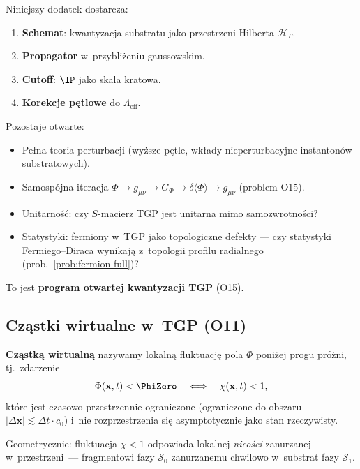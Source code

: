 \begin{problem}%
\label{prob:kwantyzacja}
Niniejszy dodatek dostarcza:
\begin{enumerate}[nosep]
    \item \textbf{Schemat}: kwantyzacja substratu jako przestrzeni
          Hilberta $\mathcal{H}_\Gamma$.
    \item \textbf{Propagator} w~przybliżeniu gaussowskim.
    \item \textbf{Cutoff}: $\lP$ jako skala kratowa.
    \item \textbf{Korekcje pętlowe} do $\Lambda_{\mathrm{eff}}$.
\end{enumerate}
Pozostaje otwarte:
\begin{itemize}[nosep]
    \item Pełna teoria perturbacji (wyższe pętle,
          wkłady nieperturbacyjne instantonów substratowych).
    \item Samospójna iteracja $\Phi \to g_{\mu\nu} \to G_\Phi
          \to \delta\langle\Phi\rangle \to g_{\mu\nu}$
          (problem O15).
    \item Unitarność: czy $S$-macierz TGP jest unitarna
          mimo samozwrotności?
    \item Statystyki: fermiony w~TGP jako topologiczne defekty
          --- czy statystyki Fermiego--Diraca wynikają
          z~topologii profilu radialnego (prob.~\ref{prob:fermion-full})?
\end{itemize}
To jest \textbf{program otwartej kwantyzacji TGP} (O15).
\end{problem}

\subsection{Cz\k{a}stki wirtualne w~TGP (O11)}%
\label{app:E-virtual}

\begin{definition}\label{def:virtual-particle}
\textbf{Cz\k{a}stk\k{a} wirtualn\k{a}} nazywamy lokaln\k{a} fluktuacj\k{e}
pola $\Phi$ poni\.zej progu pr\'o\.zni, tj.\ zdarzenie
\begin{equation}\label{eq:virtual-condition}
    \Phi(\mathbf{x}, t) < \PhiZero
    \quad \Longleftrightarrow \quad
    \chi(\mathbf{x}, t) < 1,
\end{equation}
kt\'ore jest czasowo-przestrzennie ograniczone
(ograniczone do obszaru $|\Delta\mathbf{x}| \lesssim \Delta t \cdot c_0$)
i~nie rozprzestrzenia si\k{e} asymptotycznie jako stan rzeczywisty.

Geometrycznie: fluktuacja $\chi < 1$ odpowiada lokalnej
\emph{nicości} zanurzanej w~przestrzeni~---
fragmentowi fazy $\mathcal{S}_0$
zanurzanemu chwilowo w~substrat fazy $\mathcal{S}_1$.
\end{definition}

